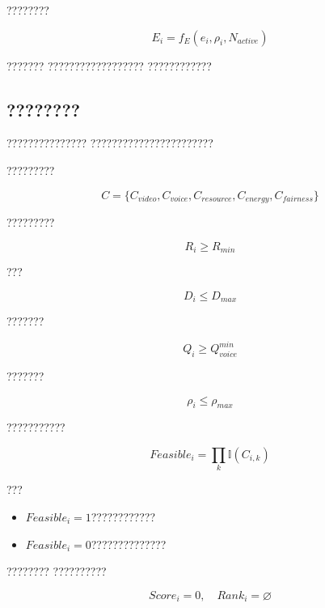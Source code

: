 ????????

\begin{equation}
E_i
=
f_E
(
e_i,\rho_i,N_{active}
)
\end{equation}


???????
??????????????????
????????????



\subsection*{????????}

???????????????
???????????????????????

?????????

\begin{equation}
C
=
\{
C_{video},
C_{voice},
C_{resource},
C_{energy},
C_{fairness}
\}
\end{equation}


?????????

\begin{equation}
R_i
\geq
R_{min}
\end{equation}


???

\begin{equation}
D_i
\leq
D_{max}
\end{equation}


???????

\begin{equation}
Q_i
\geq
Q_{voice}^{min}
\end{equation}


???????

\begin{equation}
\rho_i
\leq
\rho_{max}
\end{equation}


???????????

\begin{equation}
Feasible_i
=
\prod_k
\mathbb{I}
(
C_{i,k}
)
\end{equation}

???

\begin{itemize}
    \item $Feasible_i=1$????????????
    \item $Feasible_i=0$??????????????
\end{itemize}


????????
??????????

\begin{equation}
Score_i=0,
\quad
Rank_i=\varnothing
\end{equation}



